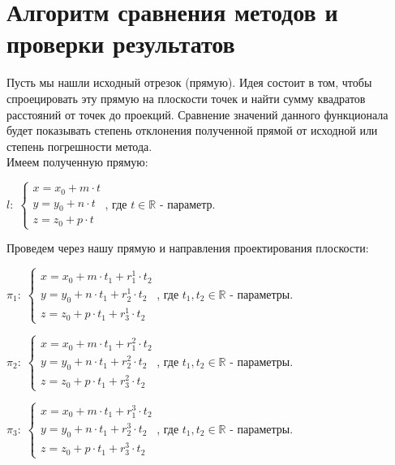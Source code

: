 \section{Алгоритм сравнения методов и проверки результатов}\label{cha:comparison/sec:alg}

Пусть мы нашли исходный отрезок (прямую). Идея состоит в том, чтобы спроецировать эту прямую на плоскости точек и найти сумму квадратов расстояний от точек до проекций. Сравнение значений данного функционала будет показывать степень отклонения полученной прямой от исходной или степень погрешности метода.\\

Имеем полученную прямую:

\begin{center}
	$\mathit{l}: \; \begin{cases}
		x = x_0 + m \cdot t \\
		y = y_0 + n \cdot t \\
		z = z_0 + p \cdot t
	\end{cases}$, где $t \in \mathbb{R}$ - параметр. 
\end{center}

Проведем через нашу прямую и направления проектирования плоскости:

\begin{center}
	$\pi_1: \; \begin{cases}
		x = x_0 + m \cdot t_1 + r_1^1 \cdot t_2 \\
		y = y_0 + n \cdot t_1 + r_2^1 \cdot t_2 \\
		z = z_0 + p \cdot t_1 + r_3^1 \cdot t_2
	\end{cases}$, где $t_1, t_2 \in \mathbb{R}$ - параметры. 

	\vspace{0.2cm}
	$\pi_2: \; \begin{cases}
		x = x_0 + m \cdot t_1 + r_1^2 \cdot t_2 \\
		y = y_0 + n \cdot t_1 + r_2^2 \cdot t_2 \\
		z = z_0 + p \cdot t_1 + r_3^2 \cdot t_2
	\end{cases}$, где $t_1, t_2 \in \mathbb{R}$ - параметры. 

	\vspace{0.2cm}
	$\pi_3: \; \begin{cases}
		x = x_0 + m \cdot t_1 + r_1^3 \cdot t_2 \\
		y = y_0 + n \cdot t_1 + r_2^3 \cdot t_2 \\
		z = z_0 + p \cdot t_1 + r_3^3 \cdot t_2
	\end{cases}$, где $t_1, t_2 \in \mathbb{R}$ - параметры. 
\end{center}

